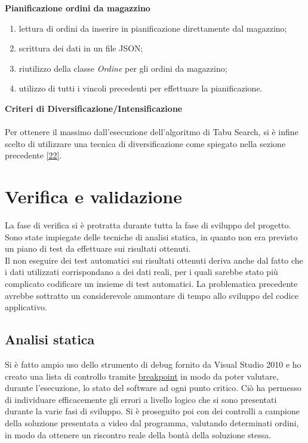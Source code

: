\textbf{Pianificazione ordini da magazzino} 
\begin{enumerate}
        \item lettura di ordini da inserire in pianificazione direttamente dal magazzino;
        \item scrittura dei dati in un file JSON;
        \item riutilizzo della classe \textit{Ordine} per gli ordini da magazzino;
        \item utilizzo di tutti i vincoli precedenti per effettuare la pianificazione.\\
\end{enumerate}

\textbf{Criteri di Diversificazione/Intensificazione}\\ \\

Per ottenere il massimo dall'esecuzione dell'algoritmo di Tabu Search, si è infine scelto di utilizzare una tecnica di diversificazione come spiegato nella sezione precedente \hyperref[criteria]{[22]}.

\newpage

\section{Verifica e validazione}

La fase di verifica si è protratta durante tutta la fase di sviluppo del progetto. Sono state impiegate delle tecniche di analisi statica, in quanto non era previsto un piano di test
da effettuare sui risultati ottenuti.\\ Il non eseguire dei test automatici sui risultati ottenuti deriva anche dal fatto che i dati utilizzati corrispondano
a dei dati reali, per i quali sarebbe stato più complicato codificare un insieme di test automatici. La problematica precedente avrebbe sottratto un considerevole ammontare di tempo allo sviluppo del
codice applicativo. 

\subsection{Analisi statica}

Si è fatto ampio uso dello strumento di debug fornito da Visual Studio 2010 e ho creato una lista di controllo tramite \hyperref[Breakpoint]{breakpoint\glo} in modo da poter
valutare, durante l'esecuzione, lo stato del software ad ogni punto critico. Ciò ha permesso di individuare efficacemente gli errori a livello logico che si sono presentati
durante la varie fasi di sviluppo. Si è proseguito poi con dei controlli a campione della soluzione presentata a video dal programma, 
valutando determinati ordini, in modo da ottenere un riscontro reale della bontà della soluzione stessa. 

